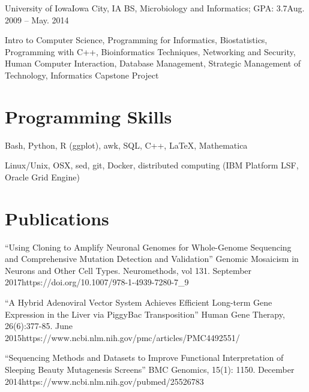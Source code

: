       \resumeSubheading
      {University of Iowa}{Iowa City, IA}
      {BS, Microbiology and Informatics;  GPA: 3.7}{Aug. 2009 -- May. 2014}
      
      \resumeItemListStart
      
         {Intro to Computer Science, Programming for Informatics, Biostatistics, Programming with C++, Bioinformatics Techniques, Networking and Security, Human Computer Interaction, Database Management, Strategic Management of Technology, Informatics Capstone Project}
      
      \resumeItemListEnd
   
   \resumeSubHeadingListEnd


\section{Programming Skills}
	\resumeSubHeadingListStart

		{Bash, Python, R (ggplot), awk, SQL, C++, \LaTeX, Mathematica}
		  
		{Linux/Unix, OSX, sed, git, Docker, distributed computing (IBM Platform LSF, Oracle Grid Engine)}
		  
	\resumeSubHeadingListEnd

\section{Publications}
	\resumeSubHeadingListStart

      { ``Using Cloning to Amplify Neuronal Genomes for Whole-Genome Sequencing and Comprehensive Mutation Detection and Validation'' Genomic Mosaicism in Neurons and Other Cell Types. Neuromethods, vol 131. September 2017}{https://doi.org/10.1007/978-1-4939-7280-7\_9}

		{ ``A Hybrid Adenoviral Vector System Achieves Efficient Long-term Gene Expression in the Liver via PiggyBac Transposition'' Human Gene Therapy, 26(6):377-85. June 2015}{https://www.ncbi.nlm.nih.gov/pmc/articles/PMC4492551/}
      
      { ``Sequencing Methods and Datasets to Improve Functional Interpretation of Sleeping Beauty Mutagenesis Screens'' BMC Genomics, 15(1): 1150. December 2014}{https://www.ncbi.nlm.nih.gov/pubmed/25526783}

	\resumeSubHeadingListEnd

